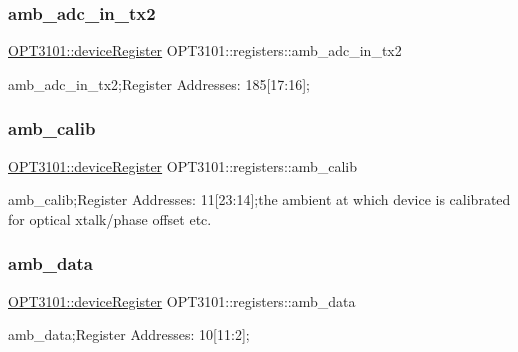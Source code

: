 \subsubsection{\texorpdfstring{amb\+\_\+adc\+\_\+in\+\_\+tx2}{amb\_adc\_in\_tx2}}
{\footnotesize\ttfamily \mbox{\hyperlink{class_o_p_t3101_1_1device_register}{O\+P\+T3101\+::device\+Register}} O\+P\+T3101\+::registers\+::amb\+\_\+adc\+\_\+in\+\_\+tx2}



amb\+\_\+adc\+\_\+in\+\_\+tx2;Register Addresses\+: 185\mbox{[}17\+:16\mbox{]}; 

\mbox{\label{class_o_p_t3101_1_1registers_a445694de6c4a8e73fbcb18d8a0b66292}} 
\subsubsection{\texorpdfstring{amb\+\_\+calib}{amb\_calib}}
{\footnotesize\ttfamily \mbox{\hyperlink{class_o_p_t3101_1_1device_register}{O\+P\+T3101\+::device\+Register}} O\+P\+T3101\+::registers\+::amb\+\_\+calib}



amb\+\_\+calib;Register Addresses\+: 11\mbox{[}23\+:14\mbox{]};the ambient at which device is calibrated for optical xtalk/phase offset etc. 

\mbox{\label{class_o_p_t3101_1_1registers_ae6b7c86e96cbfb1efe3263caed9de137}} 
\subsubsection{\texorpdfstring{amb\+\_\+data}{amb\_data}}
{\footnotesize\ttfamily \mbox{\hyperlink{class_o_p_t3101_1_1device_register}{O\+P\+T3101\+::device\+Register}} O\+P\+T3101\+::registers\+::amb\+\_\+data}



amb\+\_\+data;Register Addresses\+: 10\mbox{[}11\+:2\mbox{]}; 

\mbox{\label{class_o_p_t3101_1_1registers_a5ba6f5ef459327f64179b6d405dbd101}} 
